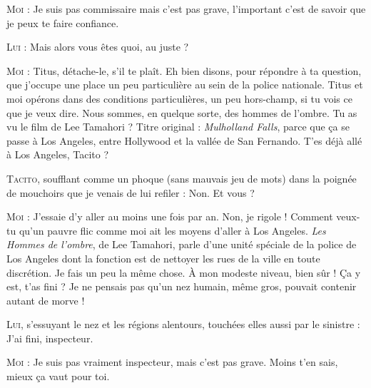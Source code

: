 \begin{dialogue}
\textsc{Moi} : Je suis pas commissaire mais c’est pas grave, l’important c’est de savoir que je peux te faire confiance.

\textsc{Lui} : Mais alors vous êtes quoi, au juste ?

\textsc{Moi} : Titus, détache-le, s’il te plaît. Eh bien disons, pour répondre à ta question, que j’occupe une place un peu particulière au sein de la police nationale. Titus et moi opérons dans des conditions particulières, un peu hors-champ, si tu vois ce que je veux dire. Nous sommes, en quelque sorte, des hommes de l’ombre. Tu as vu le film de Lee Tamahori ? Titre original : \textit{Mulholland Falls}, parce que ça se passe à Los Angeles, entre Hollywood et la vallée de San Fernando. T’es déjà allé à Los Angeles, Tacito ?

\textsc{Tacito}, soufflant comme un phoque (sans mauvais jeu de mots) dans la poignée de mouchoirs que je venais de lui refiler : Non. Et vous ?

\textsc{Moi} : J’essaie d’y aller au moins une fois par an. Non, je rigole ! Comment veux-tu qu’un pauvre flic comme moi ait les moyens d’aller à Los Angeles. \textit{Les Hommes de l’ombre}, de Lee Tamahori, parle d’une unité spéciale de la police de Los Angeles dont la fonction est de nettoyer les rues de la ville en toute discrétion. Je fais un peu la même chose. À mon modeste niveau, bien sûr ! Ça y est, t’as fini ? Je ne pensais pas qu’un nez humain, même gros, pouvait contenir autant de morve !

\textsc{Lui}, s’essuyant le nez et les régions alentours, touchées elles aussi par le sinistre : J’ai fini, inspecteur.

\textsc{Moi} : Je suis pas vraiment inspecteur, mais c’est pas grave. Moins t’en sais, mieux ça vaut pour toi.


\end{dialogue}
